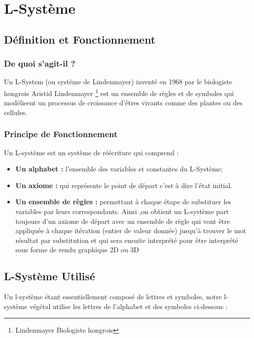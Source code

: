 \chapter{L-Système}
\section{Définition et Fonctionnement}

\subsection{De quoi s’agit-il ?}	
Un L-System (ou système de Lindenmayer) inventé en 1968 par le biologiste
hongrois Aristid Lindenmayer \footnote{Lindenmayer Biologiste hongrois} est un ensemble de règles et de symboles
qui modélisent un processus de croissance d’êtres vivants comme des plantes ou des cellules.

\subsection{Principe de Fonctionnement}
	Un L-système est un système de réécriture qui comprend : 
	\vspace{0.2cm}
\begin{itemize}
	\item \textbf {Un alphabet :} l’ensemble des variables et constantes du L-Système;
	\item \textbf{Un axiome :} qui représente le point de départ c’est à dire l’état initial.
	\item \textbf {Un ensemble de règles :} permettant à chaque étape de substituer les variables par leurs correspondants.
	\vspace{0.2cm}
	Ainsi ,on obtient un L-système part toujours d’un axiome de départ avec
un ensemble de règle qui vont être appliquée à chaque itération (entier de
valeur donnée) jusqu’à trouver le mot résultat par substitution et qui sera
ensuite interprété pour être interprété sous forme de rendu graphique 2D ou
3D
\end{itemize}		
	 
 
\section{L-Système Utilisé}
Un l-système étant essentiellement composé de lettres et symboles, notre l-
système végétal utilise les lettres de l’alphabet et des symboles ci-dessous :


